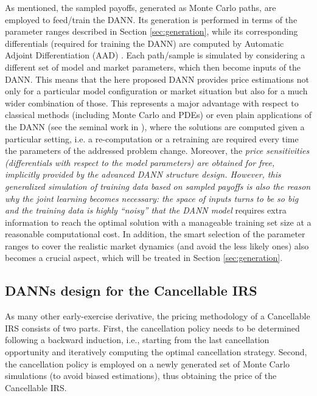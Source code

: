     As mentioned, the sampled payoffs, generated as Monte Carlo paths, are employed to feed/train the DANN. Its generation is performed in terms of the parameter ranges described in Section \ref{sec:generation}, while its corresponding differentials (required for training the DANN) are computed by Automatic Adjoint Differentiation (AAD) \cite{savine2018}. Each path/sample is simulated by considering a different set of model and market parameters, which then become inputs of the DANN. This means that the here proposed DANN provides price estimations not only for a particular model configuration or market situation but also for a much wider combination of those. This represents a major advantage with respect to classical methods (including Monte Carlo and PDEs) or even plain applications of the DANN (see the seminal work in \cite{huge2020}), where the solutions are computed given a particular setting, i.e. a re-computation or a retraining are required every time the parameters of the addressed problem change. Moreover, the \emph{price sensitivities (differentials with respect to the model parameters) are obtained for free, implicitly provided by the advanced DANN structure design. However, this generalized simulation of training data based on sampled payoffs is also the reason why the joint learning becomes necessary: the space of inputs turns to be so big and the training data is highly ``noisy'' that the DANN model} requires extra information to reach the optimal solution with a manageable training set size at a reasonable computational cost. In addition, the smart selection of the parameter ranges to cover the realistic market dynamics (and avoid the less likely ones) also becomes a crucial aspect, which will be treated in Section \ref{sec:generation}.


    \subsection{DANNs design for the Cancellable IRS}

        As many other early-exercise derivative, the pricing methodology of a Cancellable IRS consists of two parts. First, the cancellation policy needs to be determined following a backward induction, i.e., starting from the last cancellation opportunity and iteratively computing the optimal cancellation strategy. Second, the cancellation policy is employed on a newly generated set of Monte Carlo simulations (to avoid biased estimations), thus obtaining the price of the Cancellable IRS.

